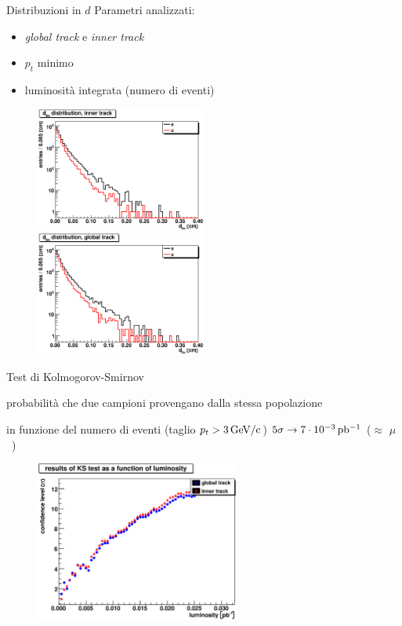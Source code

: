 \documentclass[italian]{beamer}
\begin{document}
\begin{frame}{Distribuzioni in $d$}
Parametri analizzati:
\begin{itemize}
    \item \emph{global track} e \emph{inner track}
    \item $p_t$ minimo
    \item luminosità integrata (numero di eventi)
\end{itemize}
\begin{figure}[h]
    \includegraphics[width=0.5\textwidth]{crea_istogrammi/d_lin_inner.eps}
    \includegraphics[width=0.5\textwidth]{crea_istogrammi/d_lin_global.eps}
\end{figure}
\end{frame}
\begin{frame}{Test di Kolmogorov-Smirnov}
    \begin{block}{}
        probabilità che due campioni provengano dalla stessa popolazione
    \end{block}

    \begin{block}{in funzione del numero di eventi (taglio 
        $p_t > \unit[3]{GeV/c}$)}
    $5\sigma \to \unit[7\cdot 10^{-3}]{pb^{-1}}$ ($\approx$
    \unit[250 000]{$\mu$}) 
    \end{block}
    
\begin{figure}[h]
    \includegraphics[width=0.6\textwidth]{crea_istogrammi/lum_1.eps}
\end{figure}
\end{frame}
\end{document}
